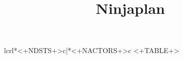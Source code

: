 \documentclass{ucph-revy}
\title{Ninjaplan}
\begin{document}
\maketitle

\centering

\begin{longtable}{lcrl*{<+NDSTS+>}{c}|*{<+NACTORS+>}{c}}
<+TABLE+>
\end{longtable}
\end{document}
